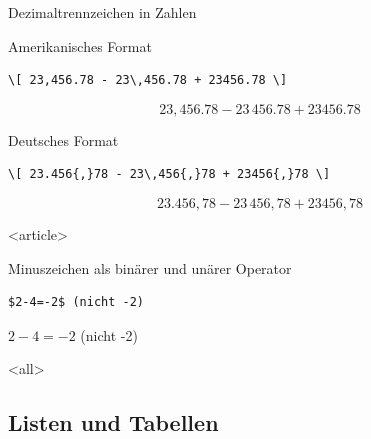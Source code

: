 \begin{Frame}[fragile]{Dezimaltrennzeichen in Zahlen}
  \begin{Block}{Amerikanisches Format}
    \begin{lstlisting}[gobble=6,style=block]
      \[ 23,456.78 - 23\,456.78 + 23456.78 \]
    \end{lstlisting}

    \[ 23,456.78 - 23\,456.78 + 23456.78 \]
  \end{Block}

  \xxx

  \begin{Block}{Deutsches Format}
    \begin{lstlisting}[gobble=6,style=block]
      \[ 23.456{,}78 - 23\,456{,}78 + 23456{,}78 \]
    \end{lstlisting}

    \[ 23.456{,}78 - 23\,456{,}78 + 23456{,}78 \]
  \end{Block}
\end{Frame}

\mode
<article>

\begin{Block}{Minuszeichen als binärer und unärer Operator}
  \begin{lstlisting}[gobble=8]
    $2-4=-2$ (nicht -2)
  \end{lstlisting}
  $2-4=-2$ (nicht -2)
\end{Block}

\mode
<all>

\subsection{Listen und Tabellen}

